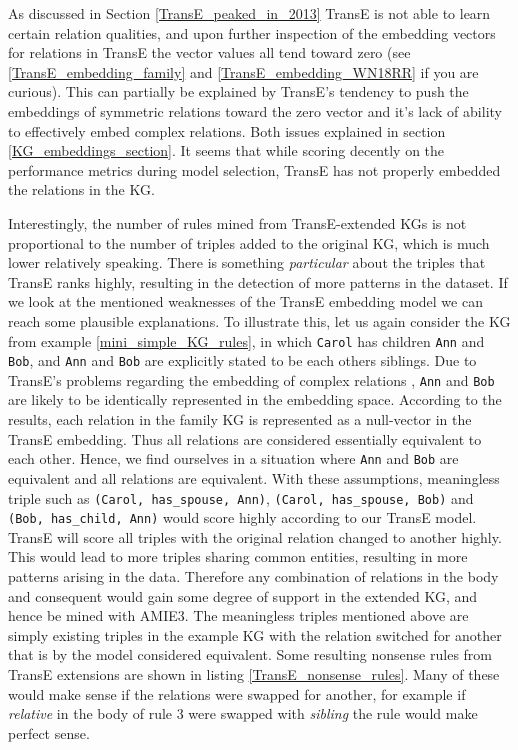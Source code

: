 As discussed in Section \ref{TransE_peaked_in_2013} TransE is not able to learn certain relation qualities, and upon further inspection of the embedding vectors for relations in TransE the vector values all tend toward zero (see \ref{TransE_embedding_family} and \ref{TransE_embedding_WN18RR} if you are curious). This can partially be explained by TransE's tendency to push the embeddings of symmetric relations toward the zero vector and it's lack of ability to effectively embed complex relations. Both issues explained in section \ref{KG_embeddings_section}. It seems that while scoring decently on the performance metrics during model selection, TransE has not properly embedded the relations in the KG. 

Interestingly, the number of rules mined from TransE-extended KGs is not proportional to the number of triples added to the original KG, which is much lower relatively speaking. There is something \textit{particular} about the triples that TransE ranks highly, resulting in the detection of more patterns in the dataset. If we look at the mentioned weaknesses of the TransE embedding model we can reach some plausible explanations. To illustrate this, let us again consider the KG from example \ref{mini_simple_KG_rules}, in which \texttt{Carol} has children \texttt{Ann} and \texttt{Bob}, and \texttt{Ann} and \texttt{Bob} are explicitly stated to be each others siblings. Due to TransE's problems regarding the embedding of complex relations \cite{transH, transR}, \texttt{Ann} and \texttt{Bob} are likely to be identically represented in the embedding space. According to the results, each relation in the family KG is represented as a null-vector in the TransE embedding. Thus all relations are considered essentially equivalent to each other. Hence, we find ourselves in a situation where \texttt{Ann} and \texttt{Bob} are equivalent and all relations are equivalent. With these assumptions, meaningless triple such as
\texttt{(Carol, has\_spouse, Ann)}, \texttt{(Carol, has\_spouse, Bob)} and \texttt{(Bob, has\_child, Ann)} would score highly according to our TransE model. TransE will score all triples with the original relation changed to another highly. This would lead to more triples sharing common entities, resulting in more patterns arising in the data. Therefore any combination of relations in the body and consequent would gain some degree of support in the extended KG, and hence be mined with AMIE3. The meaningless triples mentioned above are simply existing triples in the example KG with the relation switched for another that is by the model considered equivalent. Some resulting nonsense rules from TransE extensions are shown in listing \ref{TransE_nonsense_rules}. Many of these would make sense if the relations were swapped for another, for example if \textit{relative} in the body of rule 3 were swapped with \textit{sibling} the rule would make perfect sense.




